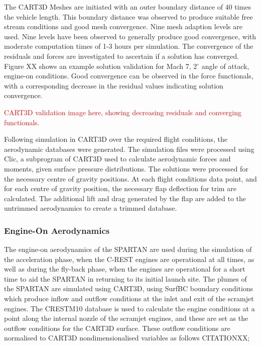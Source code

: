		The CART3D Meshes are initiated with an outer boundary distance of 40 times the vehicle length. This boundary distance was observed to produce suitable free stream conditions and good mesh convergence. Nine mesh adaption levels are used. Nine levels have been observed to generally produce good convergence, with moderate computation times of 1-3 hours per simulation. The convergence of the residuals and forces are investigated to ascertain if a solution has converged. Figure XX shows an example solution validation for Mach 7, 2$^\circ$ angle of attack, engine-on conditions. Good convergence can be observed in the force functionals, with a corresponding decrease in the residual values indicating solution convergence.  
		
		
		\textcolor{red}{CART3D validation image here, showing decreasing residuals and converging functionals.}
		
		Following simulation in CART3D over the required flight conditions, the aerodynamic databases were generated. The simulation files were processed using Clic, a subprogram of CART3D used to calculate aerodynamic forces and moments, given surface pressure distributions. The solutions were processed for the necessary centre of gravity positions. At each flight conditions data point, and for each centre of gravity position, the necessary flap deflection for trim are calculated. The additional lift and drag generated by the flap are added to the untrimmed aerodynamics to create a trimmed database. 
		
		
		
		

		
		\subsubsection{Engine-On Aerodynamics}\label{sec:engine-on}
		
		The engine-on aerodynamics of the SPARTAN are used during the simulation of the acceleration phase, when the C-REST engines are operational at all times, as well as during the fly-back phase, when the engines are operational for a short time to aid the SPARTAN in returning to its initial launch site. 		
		The plumes of the SPARTAN are simulated using CART3D, using SurfBC boundary conditions which produce inflow and outflow conditions at the inlet and exit of the scramjet engines\cite{Pandya2004}. The CRESTM10 database is used to calculate the engine conditions at a point along the internal nozzle of the scramjet engines, and these are set as the outflow conditions for the CART3D surface. These outflow conditions are normalised to CART3D nondimensionalised variables as follows CITATIONXX;
		
